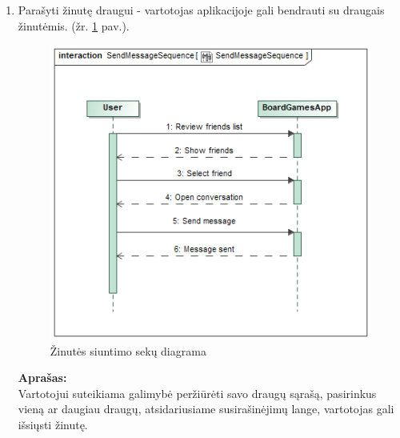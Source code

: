 \documentclass{VUMIFPSkursinis}
\begin{document}
\begin{enumerate}
			\item Parašyti žinutę draugui - vartotojas aplikacijoje gali bendrauti 
			su draugais žinutėmis. (žr. \ref{img:SendMessageSequence} pav.).
				\begin{figure}[H]
					\centering
					\includegraphics[scale=0.5]{img/SendMessageSequence}
					\caption{Žinutės siuntimo sekų diagrama}
					\label{img:SendMessageSequence}
				\end{figure}
				\textbf{Aprašas:}\\
					Vartotojui suteikiama galimybė peržiūrėti savo draugų sąrašą, 
					pasirinkus vieną ar daugiau draugų, atsidariusiame 
					susirašinėjimų lange, vartotojas gali išsiųsti žinutę.
					

\end{enumerate}
\end{document}
